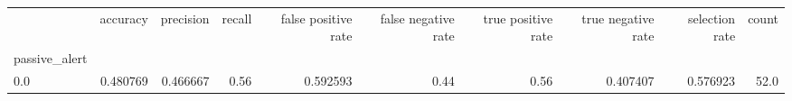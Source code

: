 \begin{tabular}{lrrrrrrrrr}
\toprule
{} &  accuracy &  precision &  recall &  false positive rate &  false negative rate &  true positive rate &  true negative rate &  selection rate &  count \\
passive\_alert &           &            &         &                      &                      &                     &                     &                 &        \\
\midrule
0.0           &  0.480769 &   0.466667 &    0.56 &             0.592593 &                 0.44 &                0.56 &            0.407407 &        0.576923 &   52.0 \\
\bottomrule
\end{tabular}
